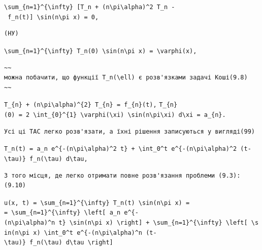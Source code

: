 \documentclass[
  ukrainian,
]{article}
\begin{document}
\texttt{\textbackslash{}sum\_\{n=1\}\^{}\{\textbackslash{}infty\}\ {[}T\textquotesingle{}\_n\ +\ (n\textbackslash{}pi\textbackslash{}alpha)\^{}2\ T\_n\ -\ f\_n(t){]}\ \textbackslash{}sin(n\textbackslash{}pi\ x)\ =\ 0,}

\begin{verbatim}
(НУ)
\end{verbatim}

\texttt{\textbackslash{}sum\_\{n=1\}\^{}\{\textbackslash{}infty\}\ T\_n(0)\ \textbackslash{}sin(n\textbackslash{}pi\ x)\ =\ \textbackslash{}varphi(x),}

\begin{verbatim}
~~
можна побачити, що функції T_n(\ell) є розв'язками задачі Коші(9.8)
~~
\end{verbatim}

\texttt{T\_\{n\}\ +\ (n\textbackslash{}pi\textbackslash{}alpha)\^{}\{2\}\ T\_\{n\}\ =\ f\_\{n\}(t),}
\texttt{T\_\{n\}(0)\ =\ 2\ \textbackslash{}int\_\{0\}\^{}\{1\}\ \textbackslash{}varphi(\textbackslash{}xi)\ \textbackslash{}sin(n\textbackslash{}pi\textbackslash{}xi)\ d\textbackslash{}xi\ =\ a\_\{n\}.}

\begin{verbatim}
Усі ці TAC легко розв'язати, а їхні рішення записуються у вигляді(99)
\end{verbatim}

\texttt{T\_n(t)\ =\ a\_n\ e\^{}\{-(n\textbackslash{}pi\textbackslash{}alpha)\^{}2\ t\}\ +\ \textbackslash{}int\_0\^{}t\ e\^{}\{-(n\textbackslash{}pi\textbackslash{}alpha)\^{}2\ (t-\textbackslash{}tau)\}\ f\_n(\textbackslash{}tau)\ d\textbackslash{}tau,}

\begin{verbatim}
З того місця, де легко отримати повне розв'язання проблеми (9.3):(9.10)
\end{verbatim}

\texttt{u(x,\ t)\ =\ \textbackslash{}sum\_\{n=1\}\^{}\{\textbackslash{}infty\}\ T\_n(t)\ \textbackslash{}sin(n\textbackslash{}pi\ x)\ =}
\texttt{=\ \textbackslash{}sum\_\{n=1\}\^{}\{\textbackslash{}infty\}\ \textbackslash{}left{[}\ a\_n\ e\^{}\{-(n\textbackslash{}pi\textbackslash{}alpha)\^{}n\ t\}\ \textbackslash{}sin(n\textbackslash{}pi\ x)\ \textbackslash{}right{]}\ +\ \textbackslash{}sum\_\{n=1\}\^{}\{\textbackslash{}infty\}\ \textbackslash{}left{[}\ \textbackslash{}sin(n\textbackslash{}pi\ x)\ \textbackslash{}int\_0\^{}t\ e\^{}\{-(n\textbackslash{}pi\textbackslash{}alpha)\^{}n\ (t-\textbackslash{}tau)\}\ f\_n(\textbackslash{}tau)\ d\textbackslash{}tau\ \textbackslash{}right{]}}
\end{document}
